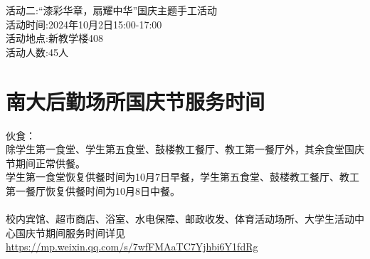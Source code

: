 \documentclass[letterpaper, 12pt]{article}
\begin{document}
\begin{multicols}{2}
活动二:“漆彩华章，扇耀中华”国庆主题手工活动\\
活动时间:2024年10月2日15:00-17:00\\活动地点:新教学楼408\\活动人数:45人
\section{南大后勤场所国庆节服务时间}
伙食：\\
除学生第一食堂、学生第五食堂、鼓楼教工餐厅、教工第一餐厅外，其余食堂国庆节期间正常供餐。\\
学生第一食堂恢复供餐时间为10月7日早餐，学生第五食堂、鼓楼教工餐厅、教工第一餐厅恢复供餐时间为10月8日中餐。\\\\
校内宾馆、超市商店、浴室、水电保障、邮政收发、体育活动场所、大学生活动中心国庆节期间服务时间详见\url{https://mp.weixin.qq.com/s/7wfFMAaTC7Yjhbi6Y1fdRg}
\end{multicols} 
\end{document}
